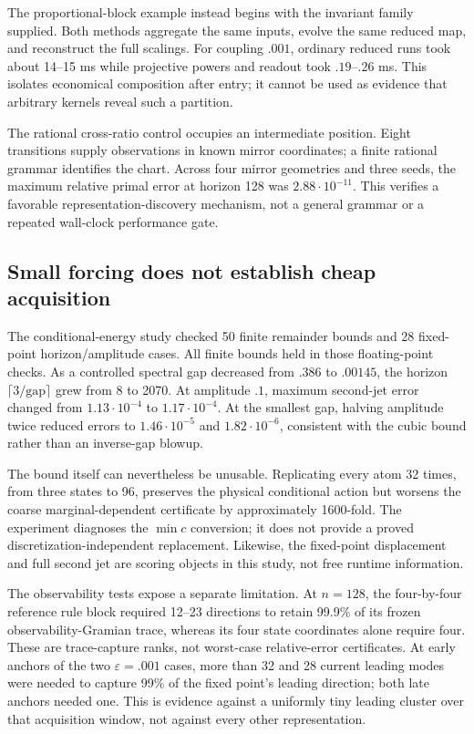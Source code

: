 \documentclass[journal]{IEEEtran}
\theoremstyle{definition}
\begin{document}
The proportional-block example instead begins with the invariant family
supplied. Both methods aggregate the same inputs, evolve the same reduced
map, and reconstruct the full scalings. For coupling $.001$, ordinary
reduced runs took about 14--15 ms while projective powers and readout took
$.19$--$.26$ ms. This isolates economical composition after entry; it
cannot be used as evidence that arbitrary kernels reveal such a partition.

The rational cross-ratio control occupies an intermediate position. Eight
transitions supply observations in known mirror coordinates; a finite
rational grammar identifies the chart. Across four mirror geometries and
three seeds, the maximum relative primal error at horizon 128 was
$2.88\cdot10^{-11}$. This verifies a favorable representation-discovery
mechanism, not a general grammar or a repeated wall-clock performance gate.

\subsection{Small forcing does not establish cheap acquisition}
The conditional-energy study checked 50 finite remainder bounds and 28
fixed-point horizon/amplitude cases. All finite bounds held in those
floating-point checks. As a controlled spectral gap decreased from $.386$
to $.00145$, the horizon $\lceil3/\mathrm{gap}\rceil$ grew from 8 to 2070.
At amplitude $.1$, maximum second-jet error changed from
$1.13\cdot10^{-4}$ to $1.17\cdot10^{-4}$. At the smallest gap, halving
amplitude twice reduced errors to $1.46\cdot10^{-5}$ and
$1.82\cdot10^{-6}$, consistent with the cubic bound rather than an
inverse-gap blowup.

The bound itself can nevertheless be unusable. Replicating every atom 32
times, from three states to 96, preserves the physical conditional action
but worsens the coarse marginal-dependent certificate by approximately
1600-fold. The experiment diagnoses the $\min c$ conversion; it does not
provide a proved discretization-independent replacement. Likewise, the
fixed-point displacement and full second jet are scoring objects in this
study, not free runtime information.

The observability tests expose a separate limitation. At $n=128$, the
four-by-four reference rule block required 12--23 directions to retain
99.9\% of its frozen observability-Gramian trace, whereas its four state
coordinates alone require four. These are trace-capture ranks, not
worst-case relative-error certificates. At early anchors of the two
$\varepsilon=.001$ cases, more than 32 and 28 current leading modes were
needed to capture 99\% of the fixed point's leading direction; both late
anchors needed one. This is evidence against a uniformly tiny leading
cluster over that acquisition window, not against every other representation.
\end{document}
